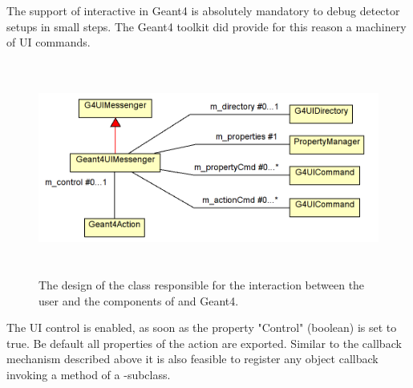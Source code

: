 \documentclass[10pt,a4paper]{article}
\begin{document}
\noindent
The support of interactive in Geant4 is absolutely mandatory to debug detector
setups in small steps. The Geant4 toolkit did provide for this reason 
a machinery of UI commands.
\begin{figure}[h]
  \begin{center}
    \includegraphics[height=70mm] {DDG4-UIMessenger.png}
    \caption{The design of the  class responsible for
        the interaction between the user and the components of \DDG and Geant4.}
    \label{fig:ddg4-tracking-action}
  \end{center}
\end{figure}

\noindent
The UI control is enabled, as soon as the property "Control" (boolean) is set to true.
Be default all properties of the action are exported.
Similar to the callback mechanism described above it is also feasible to
register any object callback invoking a method of a -subclass. 
\end{document}
